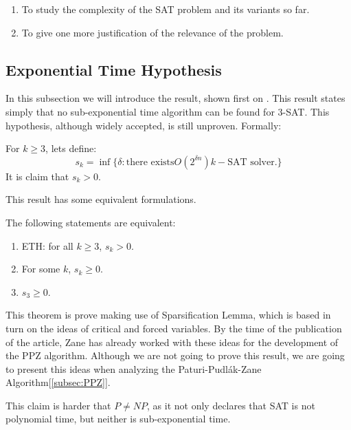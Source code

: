 \begin{enumerate}
\item To study the complexity of the SAT problem and its variants so far.

\item To give one more justification of the relevance of the problem.
\end{enumerate}

\subsection{Exponential Time Hypothesis}
\label{hyp:exponential_time}
In this subsection we will introduce the result, shown first on \cite{impagliazzo2001complexity}. This result states simply that no sub-exponential time algorithm can be found for 3-SAT. This hypothesis, although widely accepted, is still unproven. Formally:

\begin{definition}[ETH]
  For $k\ge 3$, lets define:
  $$s_k=\inf\{\delta: \text{there exists} O(2^{\delta n}) k-\text{SAT solver.}\}$$
  It is claim that $s_k>0$.
\end{definition}

This result has some equivalent formulations.

\begin{proposition}
  The following statements are equivalent:
  \begin{enumerate}
  \item ETH: for all $k\ge 3$, $s_k > 0$.
  \item For some $k$, $s_k \ge 0$.
  \item $s_3 \ge 0$.

  \end{enumerate}
  \end{proposition}

This theorem is prove making use of Sparsification Lemma, which is based in turn on the ideas of critical and forced variables. By the time of the publication of the article, Zane has already worked with these ideas for the development of the PPZ algorithm\cite{paturi1997satisfiability}. Although we are not going to prove this result, we are going to present this ideas when analyzing the Paturi-Pudlák-Zane Algorithm[\ref{subsec:PPZ}].
 
This claim is harder that $P\ne NP$, as it not only declares that SAT is not polynomial time, but neither is sub-exponential time. 

